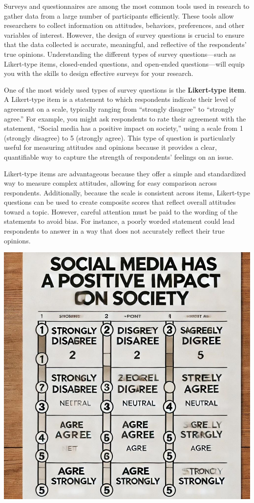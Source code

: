 \documentclass[
]{book}
\begin{document}
Surveys and questionnaires are among the most common tools used in research to gather data from a large number of participants efficiently. These tools allow researchers to collect information on attitudes, behaviors, preferences, and other variables of interest. However, the design of survey questions is crucial to ensure that the data collected is accurate, meaningful, and reflective of the respondents' true opinions. Understanding the different types of survey questions---such as Likert-type items, closed-ended questions, and open-ended questions---will equip you with the skills to design effective surveys for your research.

One of the most widely used types of survey questions is the \textbf{Likert-type item}. A Likert-type item is a statement to which respondents indicate their level of agreement on a scale, typically ranging from ``strongly disagree'' to ``strongly agree.'' For example, you might ask respondents to rate their agreement with the statement, ``Social media has a positive impact on society,'' using a scale from 1 (strongly disagree) to 5 (strongly agree). This type of question is particularly useful for measuring attitudes and opinions because it provides a clear, quantifiable way to capture the strength of respondents' feelings on an issue.

Likert-type items are advantageous because they offer a simple and standardized way to measure complex attitudes, allowing for easy comparison across respondents. Additionally, because the scale is consistent across items, Likert-type questions can be used to create composite scores that reflect overall attitudes toward a topic. However, careful attention must be paid to the wording of the statements to avoid bias. For instance, a poorly worded statement could lead respondents to answer in a way that does not accurately reflect their true opinions.

\includegraphics[width=1\textwidth,height=\textheight]{images/fig037.jpg}
\end{document}
